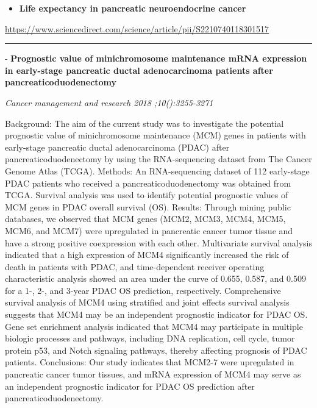 \documentclass[]{article}
\providecommand{\tightlist}{%
  \setlength{\itemsep}{0pt}\setlength{\parskip}{0pt}}
\begin{document}
\begin{itemize}
\tightlist
\item
  \textbf{Life expectancy in pancreatic neuroendocrine cancer}
\end{itemize}

\url{https://www.sciencedirect.com/science/article/pii/S2210740118301517}

\begin{center}\rule{0.5\linewidth}{\linethickness}\end{center}

 - \textbf{Prognostic value of minichromosome maintenance mRNA
expression in early-stage pancreatic ductal adenocarcinoma patients
after pancreaticoduodenectomy}

\emph{Cancer management and research 2018 ;10():3255-3271}

Background: The aim of the current study was to investigate the
potential prognostic value of minichromosome maintenance (MCM) genes in
patients with early-stage pancreatic ductal adenocarcinoma (PDAC) after
pancreaticoduodenectomy by using the RNA-sequencing dataset from The
Cancer Genome Atlas (TCGA). Methods: An RNA-sequencing dataset of 112
early-stage PDAC patients who received a pancreaticoduodenectomy was
obtained from TCGA. Survival analysis was used to identify potential
prognostic values of MCM genes in PDAC overall survival (OS). Results:
Through mining public databases, we observed that MCM genes (MCM2, MCM3,
MCM4, MCM5, MCM6, and MCM7) were upregulated in pancreatic cancer tumor
tissue and have a strong positive coexpression with each other.
Multivariate survival analysis indicated that a high expression of MCM4
significantly increased the risk of death in patients with PDAC, and
time-dependent receiver operating characteristic analysis showed an area
under the curve of 0.655, 0.587, and 0.509 for a 1-, 2-, and 3-year PDAC
OS prediction, respectively. Comprehensive survival analysis of MCM4
using stratified and joint effects survival analysis suggests that MCM4
may be an independent prognostic indicator for PDAC OS. Gene set
enrichment analysis indicated that MCM4 may participate in multiple
biologic processes and pathways, including DNA replication, cell cycle,
tumor protein p53, and Notch signaling pathways, thereby affecting
prognosis of PDAC patients. Conclusions: Our study indicates that MCM2-7
were upregulated in pancreatic cancer tumor tissues, and mRNA expression
of MCM4 may serve as an independent prognostic indicator for PDAC OS
prediction after pancreaticoduodenectomy.
\end{document}
